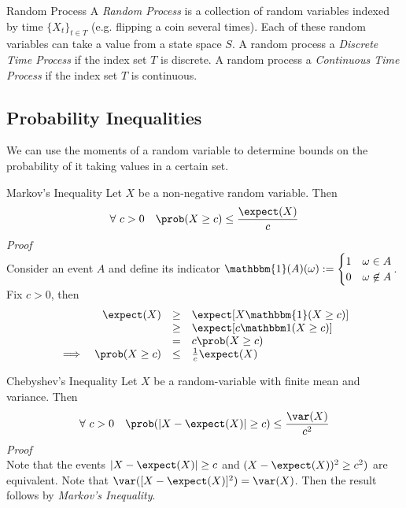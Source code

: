 \documentclass[11pt,a4paper]{article}
\begin{document}
  \begin{definition}{Random Process}
    A \textit{Random Process} is a collection of random variables indexed by time $\{X_t\}_{t\in T}$ (e.g. flipping a coin several times). Each of these random variables can take a value from a state space $S$. A random process a \textit{Discrete Time Process} if the index set $T$ is discrete. A random process a \textit{Continuous Time Process} if the index set $T$ is continuous.
  \end{definition}

\subsection{Probability Inequalities}

  \begin{remark}{We can use the moments of a random variable to determine bounds on the probability of it taking values in a certain set.}
  \end{remark}

  \begin{theorem}{Markov's Inequality}
    Let $X$ be a non-negative random variable. Then
    \[ \forall\ c>0\quad\prob(X\geq c)\leq\frac{\expect(X)}c \]
    \textit{Proof}\\
    Consider an event $A$ and define its indicator $\mathbbm{1}(A)(\omega):=\begin{cases}1&\omega\in A\\0&\omega\not\in A\end{cases}$. Fix $c>0$, then
    \[\begin{array}{rrcl}
      &\expect(X)&\geq&\expect[X\mathbbm{1}(X\geq c)]\\
      &&\geq&\expect[c\mathbbm1(X\geq c)]\\
      &&=&c\prob(X\geq c)\\
      \implies&\prob(X\geq c)&\leq&\frac1c\expect(X)
    \end{array}\]
  \end{theorem}

  \begin{theorem}{Chebyshev's Inequality}
    Let $X$ be a random-variable with finite mean and variance. Then
    \[ \forall\ c>0\quad\prob(|X-\expect(X)|\geq c)\leq\frac{\var(X)}{c^2}\]
    \textit{Proof}\\
    Note that the events $|X-\expect(X)|\geq c$ and $(X-\expect(X))^2\ge c^2)$ are equivalent. Note that $\var([X-\expect(X)]^2)=\var(X)$. Then the result follows by \textit{Markov's Inequality}.
  \end{theorem}
\end{document}

